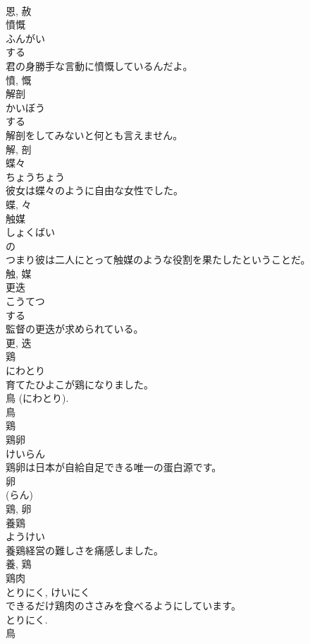 \documentclass[8pt]{extreport}
\begin{document}
\begin{CJK}{UTF8}{min}
\\	恩, 赦	
\\	憤慨	
\\	ふんがい	
\\	する 
\\	君の身勝手な言動に憤慨しているんだよ。	
\\	憤, 慨	
\\	解剖	
\\	かいぼう	
\\	する 
\\	解剖をしてみないと何とも言えません。	
\\	解, 剖	
\\	蝶々	
\\	ちょうちょう	
\\	彼女は蝶々のように自由な女性でした。	
\\	蝶, 々	
\\	触媒	
\\	しょくばい	
\\	の 
\\	つまり彼は二人にとって触媒のような役割を果たしたということだ。	
\\	触, 媒	
\\	更迭	
\\	こうてつ	
\\	する 
\\	監督の更迭が求められている。	
\\	更, 迭	
\\	鶏	
\\	にわとり	
\\	育てたひよこが鶏になりました。	
\\	鳥 (にわとり). 
\\	鳥 
\\	鶏	
\\	鶏卵	
\\	けいらん	
\\	鶏卵は日本が自給自足できる唯一の蛋白源です。	
\\	卵 
\\	(らん) 
\\	鶏, 卵	
\\	養鶏	
\\	ようけい	
\\	養鶏経営の難しさを痛感しました。	
\\	養, 鶏	
\\	鶏肉	
\\	とりにく, けいにく	
\\	できるだけ鶏肉のささみを食べるようにしています。	
\\	とりにく. 
\\	鳥 

\end{CJK}
\end{document}
